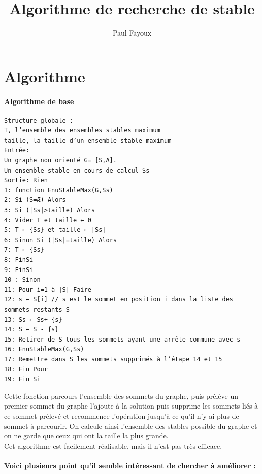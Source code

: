 \documentclass[10pt,a4paper]{article}
\author{Paul Fayoux}
\title{Algorithme de recherche de stable}
\begin{document}
\section{Algorithme}

\paragraph{Algorithme de base}

\begin{verbatim}
Structure globale :
T, l’ensemble des ensembles stables maximum
taille, la taille d’un ensemble stable maximum
Entrée:
Un graphe non orienté G= [S,A].
Un ensemble stable en cours de calcul Ss
Sortie: Rien
1: function EnuStableMax(G,Ss)
2: Si (S=Æ) Alors
3: Si (|Ss|>taille) Alors
4: Vider T et taille ← 0
5: T ← {Ss} et taille ← |Ss|
6: Sinon Si (|Ss|=taille) Alors
7: T ← {Ss}
8: FinSi
9: FinSi
10 : Sinon
11: Pour i=1 à |S| Faire
12: s ← S[i] // s est le sommet en position i dans la liste des sommets restants S
13: Ss ← Ss+ {s}
14: S ← S - {s}
15: Retirer de S tous les sommets ayant une arrête commune avec s
16: EnuStableMax(G,Ss)
17: Remettre dans S les sommets supprimés à l’étape 14 et 15
18: Fin Pour
19: Fin Si
\end{verbatim}

Cette fonction parcours l'ensemble des sommets du graphe, puis prélève un premier sommet du graphe l'ajoute à la solution puis supprime les sommets liés à ce sommet prélevé et recommence l'opération jusqu'à ce qu'il n'y ai plus de sommet à parcourir. On calcule ainsi l'ensemble des stables possible du graphe et on ne garde que ceux qui ont la taille la plus grande.
\\
Cet algorithme est facilement réalisable, mais il n'est pas très efficace.

\paragraph{Voici plusieurs point qu'il semble intéressant de chercher à améliorer :}
\end{document}
